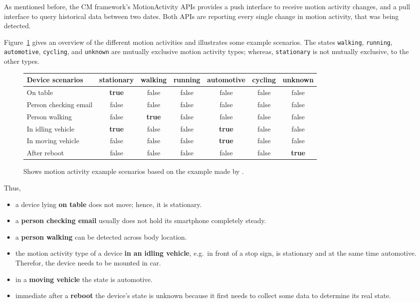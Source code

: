 As mentioned before, the \ac{CM} framework's MotionActivity \acsp{API} provides a push interface to receive motion activity changes, and a pull interface to query historical data between two dates. Both \acsp{API} are reporting every single change in motion activity, that was being detected.

Figure~\ref{fig:motionActivity} gives an overview of the different motion activities and illustrates some example scenarios. The states \texttt{walking}, \texttt{running}, \texttt{automotive}, \texttt{cycling}, and \texttt{unknown} are mutually exclusive motion activity types; whereas, \texttt{stationary} is not mutually exclusive, to the other types.

\begin{figure}
\begin{tabular}{l|c|ccccc}
Device scenarios & stationary & walking & running & automotive & cycling & unknown \\
\hline
On table & \textbf{true} & false & false & false & false & false\\
Person checking email & false & false & false & false & false & false\\
Person walking & false & \textbf{true} & false & false & false & false\\
In idling vehicle & \textbf{true} & false & false & \textbf{true} & false & false\\
In moving vehicle & false & false & false & \textbf{true} & false & false\\
After reboot & false & false & false & false & false & \textbf{true}
\end{tabular}
\caption{Shows motion activity example scenarios based on the example made by \citet{apple:wwdc_2014_pham}.}
\label{fig:motionActivity}
\end{figure}


Thus,
\begin{itemize}
  \item a device lying \textbf{on table} does not move; hence, it is stationary.
  \item a \textbf{person checking email}  usually does not hold its smartphone completely steady.
  \item a \textbf{person walking} can be detected across body location.
  \item the motion activity type of a device \textbf{in an idling vehicle}, e.g.\ in front of a stop sign, is stationary and at the same time automotive. Therefor, the device needs to be mounted in car.
  \item in a \textbf{moving vehicle} the state is automotive.
  \item immediate after a \textbf{reboot} the device's state is unknown because it first needs to collect some data to determine its real state.
\end{itemize}


